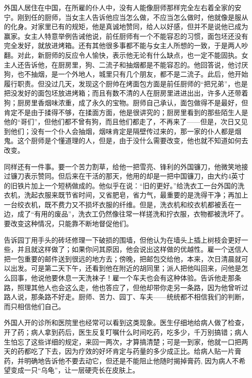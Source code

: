 \documentclass[12pt,oneside]{book}
\begin{document}
\begin{common-format}
外国人居住在中国，在所雇的仆人中，没有人能像厨师那样完全左右着全家的安宁。刚到任的厨师，当女主人告诉他应当怎么做，不应当怎么做时，他就像是服从的化身。对家里已有的规矩，他是真诚地赞同，给人以好感，但并不是说他已成为赢家。女主人特意举例告诫他说，前任厨师有一个不能容忍的习惯，面包坯还没有完全发好，就放进烤箱。还有其他很多事都不能与女主人所想的一致，于是两人吵翻。对此，新厨师的反应令人愉快，表示他无论有什么缺点，也一定不能固执。女主人还告诉他，在厨房里，狗、二流子和抽烟都是不能容忍的。他回答说，他讨厌狗，也不抽烟，是一个外地人，城里只有几个朋友，都不是二流子。此后，他开始履行职责。但没过几天，发现这个厨帅在烤面包方面是前任厨师的“把兄弟”，也是把没发好的面包坯放进烤箱；而且有数不清的人在厨房里进进出出，许多人还带着狗；厨房里香烟味浓重，成了永久的宝物。厨师自己承认，面包做得不是最好，但肯定不是由于揉得不够，在揉面方面，他是很讲究的；厨房里看到的那些陌生人是他的“哥们”，但他们都不曾有狗，而且他们都走了，不再来了——但是，次日又见到他们；没有一个仆人会抽烟，烟味肯定是隔壁传过来的，那一家的仆人都是烟鬼。这个厨师是个懂道理的人，但是，由于没什么需要改变，他也就不知道如何去改变。 

同样还有一件事。要一个苦力割草，给他一把雪亮、锋利的外国镰刀，他微笑地接过镰刀表示赞同。但后来在干活的那天，他用的却是一把中国镰刀，由大约4英寸的旧铁片加上一个短柄做成的。他似乎在说：“旧的更好。”给洗衣工一台外国的洗衣机，洗起衣服来既节省时间，又省肥皂，省力气，最重要的是洗得干净；再加上一台绞衣机，既不费力又不损坏衣服的纤维。但是，洗衣机和绞衣机都被丢在一边，成了“有用的废品”，洗衣工仍然像往常一样搓洗和拧衣服，衣物都被洗坏了。要改变这种情况，只能靠不断地督促他们。 

告诉园丁用手头的砖坯修理一下破损的围墙，但他认为在墙头上插上树枝会更好一些，并且就这样做了；如果你问其原因，他会说出这样做的优越性。雇一个送信人把一包重要的邮件送到很远的地方去；傍晚，把邮包交给他，本来，次日清晨就可以出发。可是第二天下午，还看到他在附近的胡同里；派人把他叫回来，问他是怎么回事，他说他要休息一天洗袜子！雇一个车夫也会有这种体验。告诉他走那条路，照理其他人也会这么走，他也答应了，但他却带你走另一条路，因为他曾听过路人说，那条路不好走。厨师、苦力、园丁、车夫——统统都不相信我们的判断，而只相信他们自己。 

外国人开的诊所和医院里也经常可以看到这类现象。医生仔细地给病人做了检查，开了药；病人拿到药后，医生反复叮嘱什么时间吃药，吃多少，千万别搞错；病人生怕忘了这些详细的规定，来回一两次，才算搞清楚；可是一到家，他就一口把两天的药都吃了下去，因为疗效的好坏肯定与药量的多少成正比。给病人贴一片膏药，并明确地告诉他不要去动它，但还是不能阻止他随时揭掉膏药, 因为病人不希望变成一只“乌龟”，让一层硬壳长在皮肤上。 


\end{common-format}
\end{document}
